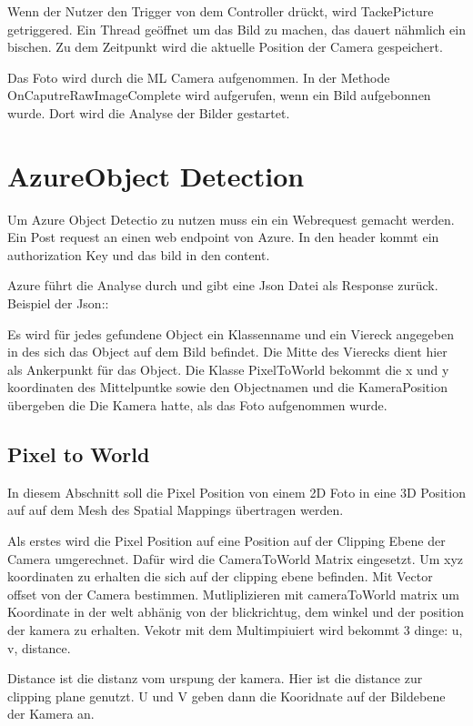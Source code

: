 \documentclass[german,a4paper, 12pt]{llncs}
\begin{document}
Wenn der Nutzer den Trigger von dem Controller drückt, wird TackePicture getriggered. 
Ein Thread geöffnet um das Bild zu machen, das dauert nähmlich ein bischen. Zu dem Zeitpunkt wird die aktuelle Position der Camera gespeichert.

Das Foto wird durch die ML Camera aufgenommen. In der Methode OnCaputreRawImageComplete wird aufgerufen, wenn ein Bild aufgebonnen wurde. Dort wird die Analyse der Bilder gestartet. 

\section{AzureObject Detection}

Um Azure Object Detectio zu nutzen muss ein ein Webrequest gemacht werden. Ein Post request an einen web endpoint von Azure. In den header kommt ein authorization Key und das bild in den content. 

Azure führt die Analyse durch und gibt eine Json Datei als Response zurück.
Beispiel der Json::

Es wird für jedes gefundene Object ein Klassenname und ein Viereck angegeben in des sich das Object auf dem Bild befindet. 
Die Mitte des Vierecks dient hier als Ankerpunkt für das Object. 
Die Klasse PixelToWorld bekommt die x und y koordinaten des Mittelpuntke sowie den Objectnamen und die KameraPosition übergeben die Die Kamera hatte, als das Foto aufgenommen wurde.

\subsection{Pixel to World}

In diesem Abschnitt soll die Pixel Position von einem 2D Foto in eine 3D Position auf auf dem Mesh des Spatial Mappings übertragen werden.

Als erstes wird die Pixel Position auf eine Position auf der Clipping Ebene der Camera umgerechnet. 
Dafür wird die CameraToWorld Matrix eingesetzt. Um xyz koordinaten zu erhalten die sich auf der clipping ebene befinden. 
Mit Vector offset von der Camera bestimmen. Mutliplizieren mit cameraToWorld matrix um Koordinate in der welt abhänig von der blickrichtug, dem winkel und der position der kamera zu erhalten.
Vekotr mit dem Multimpiuiert wird bekommt 3 dinge: u, v, distance.

Distance ist die distanz vom urspung der kamera. Hier ist die distance zur clipping plane genutzt.
U und V geben dann die Kooridnate auf der Bildebene der Kamera an.
\end{document}
